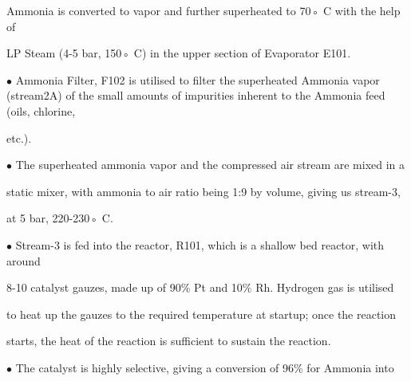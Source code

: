 \documentclass[a4paper,portrait,12pt]{article}
\begin{document}
\begin{flushleft}
Ammonia is converted to vapor and further superheated to 70◦ C with the help of
\end{flushleft}


\begin{flushleft}
LP Steam (4-5 bar, 150◦ C) in the upper section of Evaporator E101.
\end{flushleft}


\begin{flushleft}
$\bullet$ Ammonia Filter, F102 is utilised to filter the superheated Ammonia vapor (stream2A) of the small amounts of impurities inherent to the Ammonia feed (oils, chlorine,
\end{flushleft}


\begin{flushleft}
etc.).
\end{flushleft}


\begin{flushleft}
$\bullet$ The superheated ammonia vapor and the compressed air stream are mixed in a
\end{flushleft}


\begin{flushleft}
static mixer, with ammonia to air ratio being 1:9 by volume, giving us stream-3,
\end{flushleft}


\begin{flushleft}
at 5 bar, 220-230◦ C.
\end{flushleft}


\begin{flushleft}
$\bullet$ Stream-3 is fed into the reactor, R101, which is a shallow bed reactor, with around
\end{flushleft}


\begin{flushleft}
8-10 catalyst gauzes, made up of 90\% Pt and 10\% Rh. Hydrogen gas is utilised
\end{flushleft}


\begin{flushleft}
to heat up the gauzes to the required temperature at startup; once the reaction
\end{flushleft}


\begin{flushleft}
starts, the heat of the reaction is sufficient to sustain the reaction.
\end{flushleft}


\begin{flushleft}
$\bullet$ The catalyst is highly selective, giving a conversion of 96\% for Ammonia into
\end{flushleft}
\end{document}
